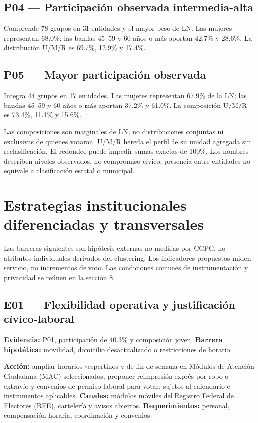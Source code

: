 \documentclass[11pt]{article}
\begin{document}
\subsection{P04 --- Participación observada intermedia-alta}
Comprende 78 grupos en 31 entidades y el mayor peso de LN. Las mujeres representan 68.0\%; las bandas 45--59 y 60 años o más aportan 42.7\% y 28.6\%. La distribución U/M/R es 69.7\%, 12.9\% y 17.4\%.

\subsection{P05 --- Mayor participación observada}
Integra 44 grupos en 17 entidades. Las mujeres representan 67.9\% de la LN; las bandas 45--59 y 60 años o más aportan 37.2\% y 61.0\%. La composición U/M/R es 73.4\%, 11.1\% y 15.6\%.

Las composiciones son marginales de LN, no distribuciones conjuntas ni exclusivas de quienes votaron. U/M/R hereda el perfil de su unidad agregada sin reclasificación. El redondeo puede impedir sumas exactas de 100\%. Los nombres describen niveles observados, no compromiso cívico; presencia entre entidades no equivale a clasificación estatal o municipal.

\section{Estrategias institucionales diferenciadas y transversales}

Las barreras siguientes son hipótesis externas no medidas por CCPC, no atributos individuales derivados del clustering. Los indicadores propuestos miden servicio, no incrementos de voto. Las condiciones comunes de instrumentación y privacidad se reúnen en la sección 8.

\subsection{E01 --- Flexibilidad operativa y justificación cívico-laboral}
\textbf{Evidencia:} P01, participación de 40.3\% y composición joven.
\textbf{Barrera hipotética:} movilidad, domicilio desactualizado o restricciones de horario.

\textbf{Acción:} ampliar horarios vespertinos y de fin de semana en Módulos de Atención Ciudadana (MAC) seleccionados, proponer reimpresión exprés por robo o extravío y convenios de permiso laboral para votar, sujetos al calendario e instrumentos aplicables.
\textbf{Canales:} módulos móviles del Registro Federal de Electores (RFE), cartelería y avisos abiertos.
\textbf{Requerimientos:} personal, compensación horaria, coordinación y convenios.
\end{document}
